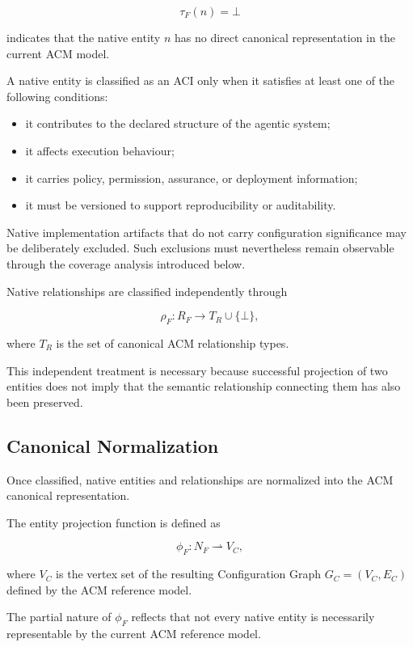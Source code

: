\documentclass[10pt]{article}
\begin{document}
\[
\tau_F(n)=\bot
\]

indicates that the native entity $n$ has no direct canonical representation in
the current ACM model.

A native entity is classified as an ACI only when it satisfies at least one of
the following conditions:

\begin{itemize}
	\item it contributes to the declared structure of the agentic system;
	\item it affects execution behaviour;
	\item it carries policy, permission, assurance, or deployment information;
	\item it must be versioned to support reproducibility or auditability.
\end{itemize}

Native implementation artifacts that do not carry configuration significance
may be deliberately excluded. Such exclusions must nevertheless remain
observable through the coverage analysis introduced below.

Native relationships are classified independently through

\[
\rho_F :
R_F
\rightarrow
T_R
\cup
\{\bot\},
\]

where $T_R$ is the set of canonical ACM relationship types.

This independent treatment is necessary because successful projection of two
entities does not imply that the semantic relationship connecting them has also
been preserved.

\subsection{Canonical Normalization}

Once classified, native entities and relationships are normalized into the ACM
canonical representation.

The entity projection function is defined as

\[
	\phi_F :
	N_F
	\rightharpoonup
	V_C,
\]

where $V_C$ is the vertex set of the resulting Configuration Graph
$G_C=(V_C,E_C)$ defined by the ACM reference model.

The partial nature of $\phi_F$ reflects that not every native entity is
necessarily representable by the current ACM reference model.
\end{document}
